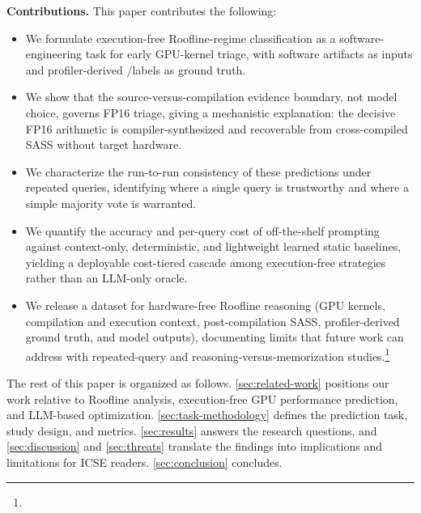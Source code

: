 \noindent\textbf{Contributions.}
This paper contributes the following:
\begin{itemize}[leftmargin=1.4em]
  \item We formulate execution-free Roofline-regime classification as a software-engineering task for early GPU-kernel triage, with software artifacts as inputs and profiler-derived \bandwidthbound/\computebound labels as ground truth.
  \item We show that the source-versus-compilation evidence boundary, not model choice, governs FP16 triage, giving a mechanistic explanation: the decisive FP16 arithmetic is compiler-synthesized and recoverable from cross-compiled SASS without target hardware.
  \item We characterize the run-to-run consistency of these predictions under repeated queries, identifying where a single query is trustworthy and where a simple majority vote is warranted.
  \item We quantify the accuracy and per-query cost of off-the-shelf prompting against context-only, deterministic, and lightweight learned static baselines, yielding a deployable cost-tiered cascade among execution-free strategies rather than an LLM-only oracle.
  \item We release a dataset for hardware-free Roofline reasoning (GPU kernels, compilation and execution context, post-compilation SASS, profiler-derived ground truth, and model outputs), documenting limits that future work can address with repeated-query and reasoning-versus-memorization studies.\footnote{\githubrepo}
\end{itemize}

The rest of this paper is organized as follows.
\autoref{sec:related-work} positions our work relative to Roofline analysis, execution-free GPU performance prediction, and LLM-based optimization.
\autoref{sec:task-methodology} defines the prediction task, study design, and metrics.
\autoref{sec:results} answers the research questions, and \autoref{sec:discussion} and \autoref{sec:threats} translate the findings into implications and limitations for ICSE readers.
\autoref{sec:conclusion} concludes.
